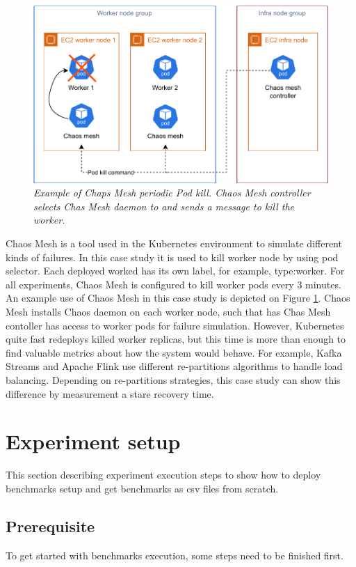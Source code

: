 \begin{figure}[ht]
    \centering
    \includegraphics[width=1\textwidth]{figures/mesh-pod-kill}
    \caption{\textit{Example of Chaps Mesh periodic Pod kill. Chaos Mesh controller selects Chas Mesh daemon to
    and sends a message to kill the worker.}}
    \label{fig:chaos-mesh-kill}
\end{figure}

Chaos Mesh \cite{chaosMesh} is a tool used in the Kubernetes environment to simulate
different kinds of failures.
In this case study it is used to kill worker node by using pod selector.
Each deployed worked has its own label, for example, type:worker.
For all experiments, Chaos Mesh is configured to kill worker pods every 3 minutes.
An example use of Chaos Mesh in this case study is depicted on Figure \ref{fig:chaos-mesh-kill}.
Chaos Mesh installs Chaos daemon on each worker node, such that has
Chas Mesh contoller has access to worker pods for failure simulation.
However, Kubernetes quite fast redeploys killed worker replicas, but this time is more than enough
to find valuable metrics about how the system would behave.
For example, Kafka Streams and Apache Flink use different re-partitions algorithms to
handle load balancing.
Depending on re-partitions strategies, this case study can show this difference by measurement
a stare recovery time.

\section{Experiment setup}\label{sec:experiment-setup}
This section describing experiment execution steps to show how to deploy benchmarks setup and
get benchmarks as csv files from scratch.

\subsection{Prerequisite}\label{subsec:prerequisite}
To get started with benchmarks execution, some steps need to be finished first.

